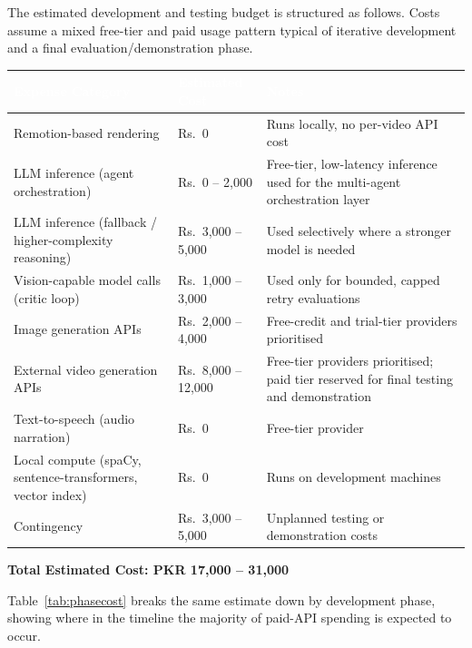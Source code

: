 \documentclass[11pt,a4paper]{article}
\newcommand{\tblhead}[1]{\cellcolor{headerblue}\textcolor{white}{\textbf{#1}}}
\begin{document}
The estimated development and testing budget is structured as follows. Costs assume a mixed free-tier and paid usage pattern typical of iterative development and a final evaluation/demonstration phase.

\begin{center}
\begin{tabular}{|p{5cm}|p{3.2cm}|p{5.3cm}|}
\hline
\tblhead{Expense Category} & \tblhead{Estimated Cost} & \tblhead{Notes} \\
\hline
Remotion-based rendering & Rs.\ 0 & Runs locally, no per-video API cost \\
\hline
LLM inference (agent orchestration) & Rs.\ 0 -- 2,000 & Free-tier, low-latency inference used for the multi-agent orchestration layer \\
\hline
LLM inference (fallback / higher-complexity reasoning) & Rs.\ 3,000 -- 5,000 & Used selectively where a stronger model is needed \\
\hline
Vision-capable model calls (critic loop) & Rs.\ 1,000 -- 3,000 & Used only for bounded, capped retry evaluations \\
\hline
Image generation APIs & Rs.\ 2,000 -- 4,000 & Free-credit and trial-tier providers prioritised \\
\hline
External video generation APIs & Rs.\ 8,000 -- 12,000 & Free-tier providers prioritised; paid tier reserved for final testing and demonstration \\
\hline
Text-to-speech (audio narration) & Rs.\ 0 & Free-tier provider \\
\hline
Local compute (spaCy, sentence-transformers, vector index) & Rs.\ 0 & Runs on development machines \\
\hline
Contingency & Rs.\ 3,000 -- 5,000 & Unplanned testing or demonstration costs \\
\hline
\end{tabular}
\end{center}

\begin{center}
\textbf{Total Estimated Cost: PKR 17,000 -- 31,000}
\end{center}

Table~\ref{tab:phasecost} breaks the same estimate down by development phase, showing where in the timeline the majority of paid-API spending is expected to occur.
\end{document}

